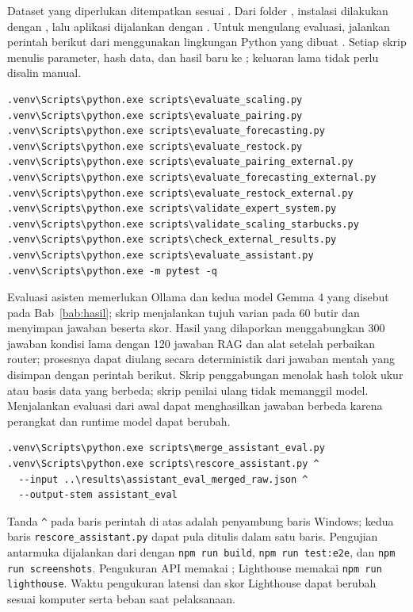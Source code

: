 Dataset yang diperlukan ditempatkan sesuai . Dari folder , instalasi dilakukan dengan , lalu aplikasi dijalankan dengan . Untuk mengulang evaluasi, jalankan perintah berikut dari  menggunakan lingkungan Python yang dibuat . Setiap skrip menulis parameter, hash data, dan hasil baru ke ; keluaran lama tidak perlu disalin manual.

\begin{verbatim}
.venv\Scripts\python.exe scripts\evaluate_scaling.py
.venv\Scripts\python.exe scripts\evaluate_pairing.py
.venv\Scripts\python.exe scripts\evaluate_forecasting.py
.venv\Scripts\python.exe scripts\evaluate_restock.py
.venv\Scripts\python.exe scripts\evaluate_pairing_external.py
.venv\Scripts\python.exe scripts\evaluate_forecasting_external.py
.venv\Scripts\python.exe scripts\evaluate_restock_external.py
.venv\Scripts\python.exe scripts\validate_expert_system.py
.venv\Scripts\python.exe scripts\validate_scaling_starbucks.py
.venv\Scripts\python.exe scripts\check_external_results.py
.venv\Scripts\python.exe scripts\evaluate_assistant.py
.venv\Scripts\python.exe -m pytest -q
\end{verbatim}

Evaluasi asisten memerlukan Ollama dan kedua model Gemma 4 yang disebut pada Bab~\ref{bab:hasil}; skrip menjalankan tujuh varian pada 60 butir dan menyimpan jawaban beserta skor. Hasil yang dilaporkan menggabungkan 300 jawaban kondisi lama dengan 120 jawaban RAG dan alat setelah perbaikan router; prosesnya dapat diulang secara deterministik dari jawaban mentah yang disimpan dengan perintah berikut. Skrip penggabungan menolak hash tolok ukur atau basis data yang berbeda; skrip penilai ulang tidak memanggil model. Menjalankan evaluasi dari awal dapat menghasilkan jawaban berbeda karena perangkat dan runtime model dapat berubah.

\begin{verbatim}
.venv\Scripts\python.exe scripts\merge_assistant_eval.py
.venv\Scripts\python.exe scripts\rescore_assistant.py ^
  --input ..\results\assistant_eval_merged_raw.json ^
  --output-stem assistant_eval
\end{verbatim}

Tanda \texttt{\^{}} pada baris perintah di atas adalah penyambung baris Windows; kedua baris \texttt{rescore\_assistant.py} dapat pula ditulis dalam satu baris. Pengujian antarmuka dijalankan dari  dengan \texttt{npm run build}, \texttt{npm run test:e2e}, dan \texttt{npm run screenshots}. Pengukuran API memakai ; Lighthouse memakai \texttt{npm run lighthouse}. Waktu pengukuran latensi dan skor Lighthouse dapat berubah sesuai komputer serta beban saat pelaksanaan.

